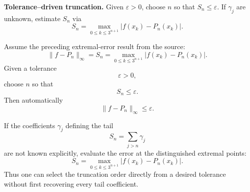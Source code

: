 \begin{problem}[CP-II-0456]
\label{prob:cp-ii-0456}
\textbf{Tolerance--driven truncation.}
	Given $\varepsilon>0$, choose $n$ so that $S_n\le \varepsilon$. If $\gamma_j$ are unknown,
	estimate $S_n$ via
	\[
	S_n = \max_{0\le k\le 3^{n+1}} |f(x_k)-P_n(x_k)|.
	\]
\end{problem}

\begin{solution}
Assume the preceding extremal-error result from the source:
\[
\|f-P_n\|_\infty
=
S_n
=
\max_{0\le k\le3^{n+1}}
|f(x_k)-P_n(x_k)|.
\]
Given a tolerance
\[
\varepsilon>0,
\]
choose \(n\) so that
\[
S_n\le\varepsilon.
\]
Then automatically
\[
\boxed{
\|f-P_n\|_\infty\le\varepsilon.
}
\]

If the coefficients \(\gamma_j\) defining the tail
\[
S_n=\sum_{j>n}\gamma_j
\]
are not known explicitly, evaluate the error at the distinguished extremal points:
\[
\boxed{
S_n
=
\max_{0\le k\le3^{n+1}}
|f(x_k)-P_n(x_k)|.
}
\]
Thus one can select the truncation order directly from a desired tolerance without first
recovering every tail coefficient.
\end{solution}


